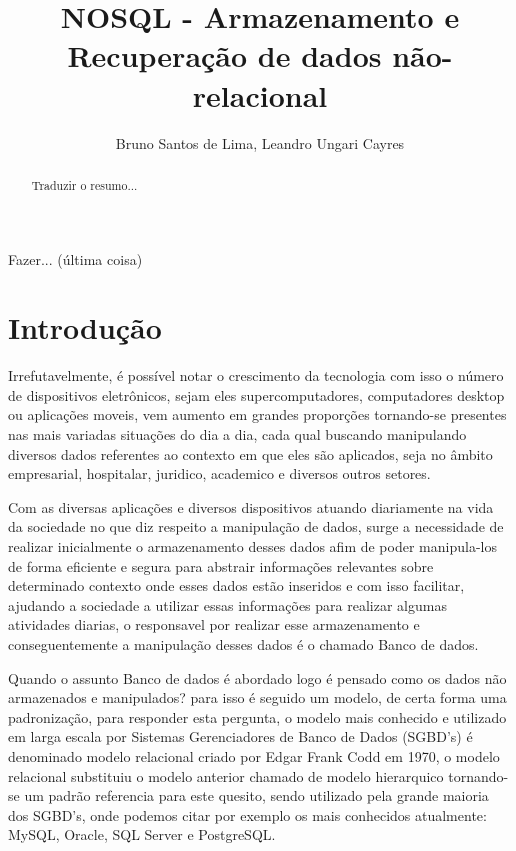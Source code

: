 \documentclass[12pt]{article}
\title{NOSQL - Armazenamento e Recuperação de dados não-relacional}
\author{Bruno Santos de Lima\inst{1}, Leandro Ungari Cayres\inst{1} }
\begin{document}
 

\maketitle

\begin{abstract}
Traduzir o resumo...
\end{abstract}
     
\begin{resumo} 
Fazer... (última coisa)
\end{resumo}


\section{Introdução}
\label{sec:intro}
Irrefutavelmente, é possível notar o crescimento da tecnologia com isso o número de dispositivos eletrônicos, sejam eles supercomputadores, computadores desktop ou aplicações moveis, vem aumento em grandes proporções tornando-se presentes nas mais variadas situações do dia a dia, cada qual buscando manipulando diversos dados referentes ao contexto em que eles são aplicados, seja no âmbito empresarial, hospitalar, juridico, academico e diversos outros setores.

Com as diversas aplicações e diversos dispositivos atuando diariamente na vida da sociedade no que diz respeito a manipulação de dados, surge a necessidade de realizar inicialmente o armazenamento desses dados afim de poder manipula-los de forma eficiente e segura para abstrair informações relevantes sobre determinado contexto onde esses dados estão inseridos e com isso facilitar, ajudando a sociedade a utilizar essas informações para realizar algumas atividades diarias, o responsavel por realizar esse armazenamento e conseguentemente a manipulação desses dados é o chamado Banco de dados.

Quando o assunto Banco de dados é abordado logo é pensado como os dados não armazenados e manipulados? para isso é seguido um modelo, de certa forma uma padronização, para responder esta pergunta, o modelo mais conhecido e utilizado em larga escala por Sistemas Gerenciadores de Banco de Dados (SGBD's) é denominado modelo relacional \cite{codd:1970} criado por Edgar Frank Codd em 1970, o modelo relacional substituiu o modelo anterior chamado de modelo hierarquico tornando-se um padrão referencia para este quesito, sendo utilizado pela grande maioria dos SGBD's, onde podemos citar por exemplo os mais conhecidos atualmente: MySQL, Oracle, SQL Server e PostgreSQL.\cite{brito2010bancos}
\end{document}
